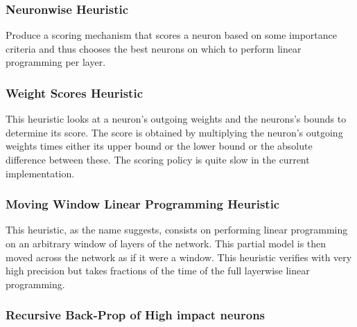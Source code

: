 \documentclass[11pt,a4paper]{article}
\begin{document}
\subsubsection{Neuronwise Heuristic}


Produce a scoring mechanism that scores a neuron based on some importance criteria and thus chooses the best neurons on which to perform linear programming per layer.

\subsubsection{Weight Scores Heuristic}

This heuristic looks at a neuron's outgoing weights and the neurons's bounds to determine its score. The score is obtained by multiplying the neuron's outgoing weights times either its  upper bound or the lower bound or the absolute difference between these. The scoring policy is quite slow in the current implementation.

\subsubsection{Moving Window Linear Programming Heuristic}

This heuristic, as the name suggests, consists on performing linear programming on an arbitrary window of layers of the network. This partial model is then moved across the network as if it were a window.
This heuristic verifies with very high precision but takes fractions of the time of the full layerwise linear programming.


\subsubsection{Recursive Back-Prop of High impact neurons}
\end{document}
